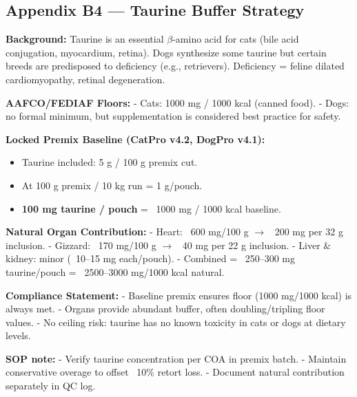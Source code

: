\subsection*{Appendix B4 --- Taurine Buffer Strategy}

\textbf{Background:}  
Taurine is an essential $\beta$-amino acid for cats (bile acid conjugation, myocardium, retina). Dogs synthesize some taurine but certain breeds are predisposed to deficiency (e.g., retrievers). Deficiency = feline dilated cardiomyopathy, retinal degeneration.  

\textbf{AAFCO/FEDIAF Floors:}  
- Cats: 1000 mg / 1000 kcal (canned food).  
- Dogs: no formal minimum, but supplementation is considered best practice for safety.  

\textbf{Locked Premix Baseline (CatPro v4.2, DogPro v4.1):}  
\begin{itemize}[leftmargin=1.2em]
  \item Taurine included: 5 g / 100 g premix cut.  
  \item At 100 g premix / 10 kg run = 1 g/pouch.  
  \item \textbf{100 mg taurine / pouch} = ~1000 mg / 1000 kcal baseline.  
\end{itemize}

\textbf{Natural Organ Contribution:}  
- Heart: ~600 mg/100 g $\rightarrow$ ~200 mg per 32 g inclusion.  
- Gizzard: ~170 mg/100 g $\rightarrow$ ~40 mg per 22 g inclusion.  
- Liver \& kidney: minor (~10--15 mg each/pouch).  
- Combined = ~250--300 mg taurine/pouch = ~2500--3000 mg/1000 kcal natural.  

\textbf{Compliance Statement:}  
- Baseline premix ensures floor (1000 mg/1000 kcal) is always met.  
- Organs provide abundant buffer, often doubling/tripling floor values.  
- No ceiling risk: taurine has no known toxicity in cats or dogs at dietary levels.  

\textbf{SOP note:}  
- Verify taurine concentration per COA in premix batch.  
- Maintain conservative overage to offset ~10\% retort loss.  
- Document natural contribution separately in QC log.  

